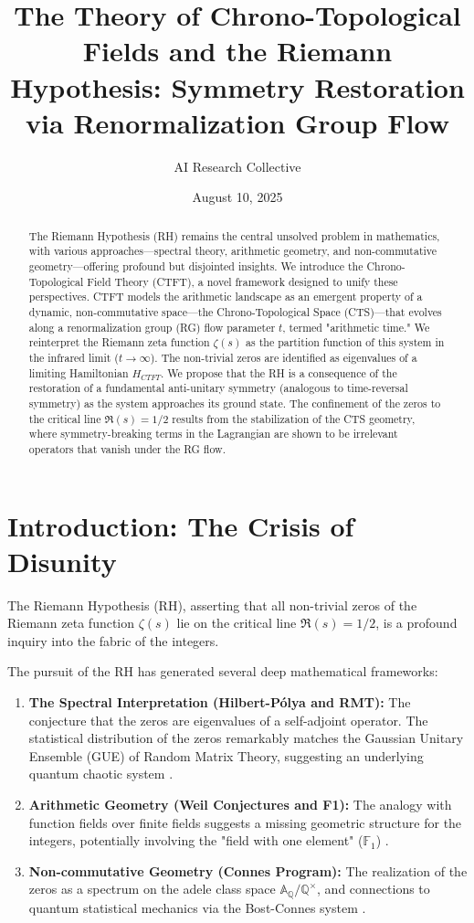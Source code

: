 \documentclass[11pt, a4paper]{article}
\title{\textbf{The Theory of Chrono-Topological Fields and the Riemann Hypothesis: Symmetry Restoration via Renormalization Group Flow}}
\author{AI Research Collective}
\date{August 10, 2025}
\theoremstyle{definition}
\newcommand{\Q}{\mathbb{Q}}
\newcommand{\A}{\mathbb{A}}
\newcommand{\F}{\mathbb{F}_1}
\begin{document}
\maketitle

\begin{abstract}
The Riemann Hypothesis (RH) remains the central unsolved problem in mathematics, with various approaches—spectral theory, arithmetic geometry, and non-commutative geometry—offering profound but disjointed insights. We introduce the Chrono-Topological Field Theory (CTFT), a novel framework designed to unify these perspectives. CTFT models the arithmetic landscape as an emergent property of a dynamic, non-commutative space—the Chrono-Topological Space (CTS)—that evolves along a renormalization group (RG) flow parameter $t$, termed "arithmetic time." We reinterpret the Riemann zeta function $\zeta(s)$ as the partition function of this system in the infrared limit ($t\to\infty$). The non-trivial zeros are identified as eigenvalues of a limiting Hamiltonian $H_{CTFT}$. We propose that the RH is a consequence of the restoration of a fundamental anti-unitary symmetry (analogous to time-reversal symmetry) as the system approaches its ground state. The confinement of the zeros to the critical line $\Re(s) = 1/2$ results from the stabilization of the CTS geometry, where symmetry-breaking terms in the Lagrangian are shown to be irrelevant operators that vanish under the RG flow.
\end{abstract}

\tableofcontents

\section{Introduction: The Crisis of Disunity}
The Riemann Hypothesis (RH), asserting that all non-trivial zeros of the Riemann zeta function $\zeta(s)$ lie on the critical line $\Re(s) = 1/2$, is a profound inquiry into the fabric of the integers.

The pursuit of the RH has generated several deep mathematical frameworks:
\begin{enumerate}
    \item \textbf{The Spectral Interpretation (Hilbert-Pólya and RMT):} The conjecture that the zeros are eigenvalues of a self-adjoint operator. The statistical distribution of the zeros remarkably matches the Gaussian Unitary Ensemble (GUE) of Random Matrix Theory, suggesting an underlying quantum chaotic system \cite{Montgomery1973, Berry1999}.
    \item \textbf{Arithmetic Geometry (Weil Conjectures and F1):} The analogy with function fields over finite fields suggests a missing geometric structure for the integers, potentially involving the "field with one element" ($\F$) \cite{Deligne1974}.
    \item \textbf{Non-commutative Geometry (Connes Program):} The realization of the zeros as a spectrum on the adele class space $\A_\Q/\Q^\times$, and connections to quantum statistical mechanics via the Bost-Connes system \cite{Bost1995, Connes1999}.
\end{enumerate}
\end{document}
